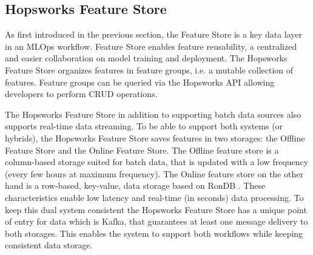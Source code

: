 \subsection{Hopsworks Feature Store}

As first introduced in the previous section, the Feature Store is a key data layer in an \gls{MLOps} workflow. Feature Store enables feature reusability, a centralized and easier collaboration on model training and deployment. The Hopsworks Feature Store organizes features in feature groups, i.e. a mutable collection of features. Feature groups can be queried via the Hopsworks \gls{API} allowing developers to perform \gls{CRUD} operations.

The Hopsworks Feature Store in addition to supporting batch data sources also supports real-time data streaming. To be able to support both systems (or hybrids), the Hopsworks Feature Store saves features in two storages: the Offline Feature Store and the Online Feature Store. The Offline feature store is a column-based storage suited for batch data, that is updated with a low frequency (every few hours at maximum frequency). The Online feature store on the other hand is a row-based, key-value, data storage based on RonDB \cite{LogicalclocksRondb2024}. These characteristics enable low latency and real-time (in seconds) data processing. To keep this dual system consistent the Hopsworks Feature Store has a unique point of entry for data which is Kafka, that guarantees at least one message delivery to both storages. This enables the system to support both workflows while keeping consistent data storage.
